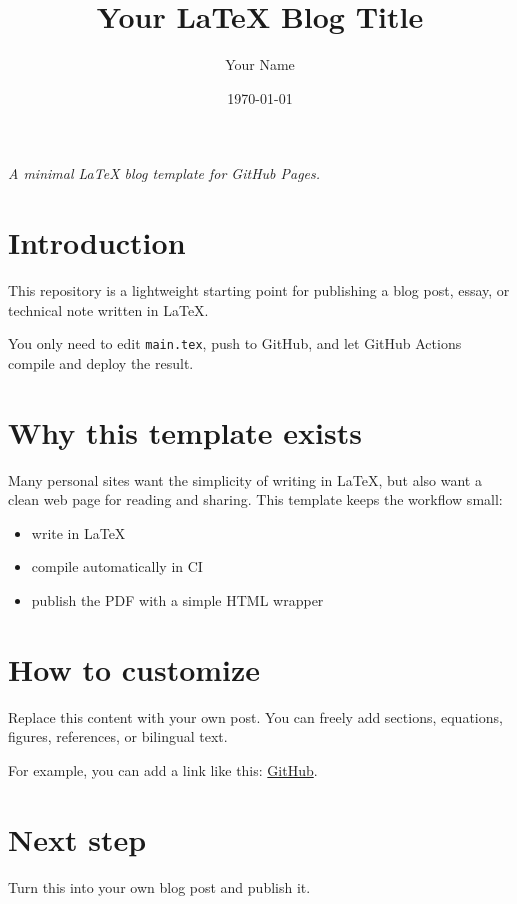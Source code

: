 \documentclass[12pt]{article}
\title{Your LaTeX Blog Title}
\author{Your Name}
\date{\today}
\begin{document}
\maketitle

\begin{center}
\textit{A minimal LaTeX blog template for GitHub Pages.}
\end{center}

\section*{Introduction}

This repository is a lightweight starting point for publishing a blog post, essay,
or technical note written in \LaTeX.

You only need to edit \texttt{main.tex}, push to GitHub, and let GitHub Actions
compile and deploy the result.

\section*{Why this template exists}

Many personal sites want the simplicity of writing in \LaTeX, but also want a
clean web page for reading and sharing. This template keeps the workflow small:

\begin{itemize}
  \item write in \LaTeX
  \item compile automatically in CI
  \item publish the PDF with a simple HTML wrapper
\end{itemize}

\section*{How to customize}

Replace this content with your own post. You can freely add sections, equations,
figures, references, or bilingual text.

For example, you can add a link like this:
\href{https://github.com/}{GitHub}.

\section*{Next step}

Turn this into your own blog post and publish it.
\end{document}

